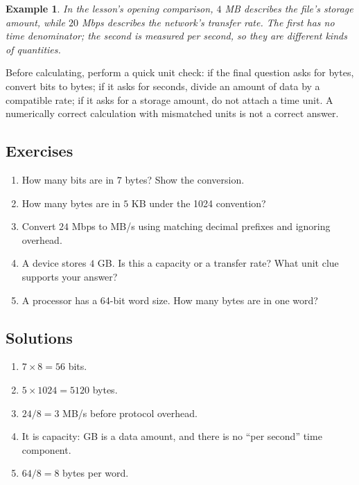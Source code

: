 \documentclass[11pt]{article}
\newtheorem{example}{Example}[section]
\begin{document}
\begin{example}
In the lesson's opening comparison, $4$ MB describes the file's storage
amount, while $20$ Mbps describes the network's transfer rate. The first
has no time denominator; the second is measured per second, so they are
different kinds of quantities.
\end{example}

Before calculating, perform a quick unit check: if the final question asks
for bytes, convert bits to bytes; if it asks for seconds, divide an amount
of data by a compatible rate; if it asks for a storage amount, do not attach
a time unit. A numerically correct calculation with mismatched units is not
a correct answer.

\subsection*{Exercises}
\begin{enumerate}[label=\arabic*.]
  \item How many bits are in $7$ bytes? Show the conversion.
  \item How many bytes are in $5$ KB under the 1024 convention?
  \item Convert $24$ Mbps to MB/s using matching decimal prefixes and
    ignoring overhead.
  \item A device stores $4$ GB. Is this a capacity or a transfer rate? What
    unit clue supports your answer?
  \item A processor has a 64-bit word size. How many bytes are in one word?
\end{enumerate}

\subsection*{Solutions}
\begingroup\small
\begin{enumerate}[label=\arabic*.]
  \item $7\times 8=56$ bits.
  \item $5\times 1024=5120$ bytes.
  \item $24/8=3$ MB/s before protocol overhead.
  \item It is capacity: GB is a data amount, and there is no ``per second''
    time component.
  \item $64/8=8$ bytes per word.
\end{enumerate}
\endgroup
\end{document}
